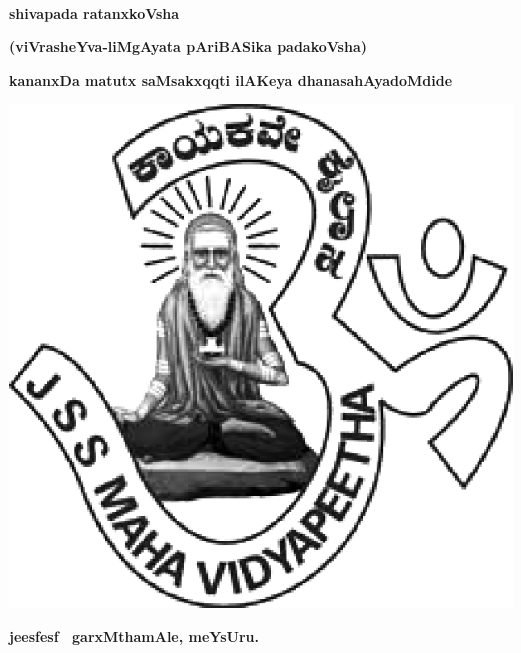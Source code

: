~\thispagestyle{empty}

\vfill

\begin{center}
{\fontsize{45}{45}\selectfont\bfseries shivapada ratanxkoVsha}\relax

\medskip

{\Large\bfseries (viVrasheYva-liMgAyata pAriBASika padakoVsha)}
\end{center}

\vfill

\centerline{\large\bfseries kananxDa matutx saMsakxqqti ilAKeya dhanasahAyadoMdide}\relax

\vfill


\centerline{\includegraphics[scale=.3]{JSSlogo.eps}}

\medskip

\centerline{\large\bfseries jeesfesf \  garxMthamAle, meYsUru.}
